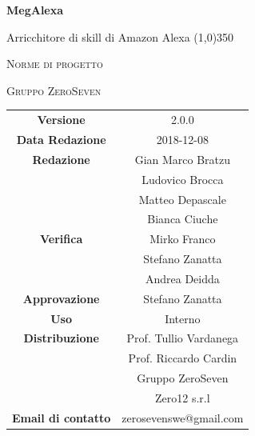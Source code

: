 \documentclass[a4paper,12pt,openany]{book}
\author{Bratzu Gian Marco}
\date{2018-12-08}
\begin{document}
\begin{titlepage}
	\centering
	{\huge\bfseries MegAlexa\par}
	Arricchitore di skill di Amazon Alexa
	\line(1,0){350} \\
	{\scshape\LARGE Norme di progetto \par}
	\vspace{1cm}
	{\scshape Gruppo ZeroSeven \par}
	\logo
	\begin{tabular}{c|c}
		{\hfill \textbf{Versione}} 			& 2.0.0				\\
		{\hfill\textbf{Data Redazione}} 	& 2018-12-08		\\ 
		{\hfill\textbf{Redazione}} 			&  		Gian Marco Bratzu\\&Ludovico Brocca\\&Matteo Depascale\\&Bianca Ciuche\\
		{\hfill\textbf{Verifica}} 				&  	Mirko Franco\\& Stefano Zanatta	\\ & Andrea Deidda \\
		{\hfill\textbf{Approvazione}} 		&  		Stefano Zanatta			\\ 
		{\hfill\textbf{Uso}} 					& 		Interno		\\ 
		{\hfill\textbf{Distribuzione}} 			& 			Prof. Tullio Vardanega \\ & Prof. Riccardo Cardin \\ & Gruppo ZeroSeven		\\ & Zero12 s.r.l \\
		{\hfill\textbf{Email di contatto}} & zerosevenswe@gmail.com \\
	\end{tabular}
\end{titlepage}
	

	
	\label{LastFrontPage}
	\newpage	
	
	\pagestyle{mymain}
	\tableofcontents
	
	
	
	
	\appendix
			
			
	\label{LastPage}
\end{document}
